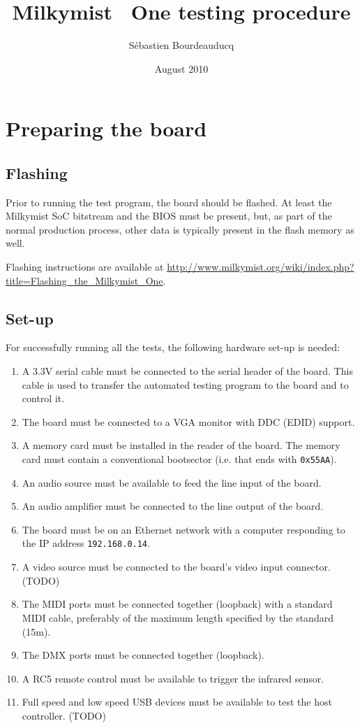 \documentclass[a4paper,11pt]{article}
\title{Milkymist\texttrademark~ One testing procedure}
\author{S\'ebastien Bourdeauducq}
\date{August 2010}
\begin{document}
\setlength{\parindent}{0pt}
\setlength{\parskip}{5pt}
\maketitle{}


\section{Preparing the board}
\subsection{Flashing}
Prior to running the test program, the board should be flashed. At least the Milkymist SoC bitstream and the BIOS must be present, but, as part of the normal production process, other data is typically present in the flash memory as well.

Flashing instructions are available at \url{http://www.milkymist.org/wiki/index.php?title=Flashing_the_Milkymist_One}.

\subsection{Set-up}
For successfully running all the tests, the following hardware set-up is needed:
\begin{enumerate}
\item A 3.3V serial cable must be connected to the serial header of the board. This cable is used to transfer the automated testing program to the board and to control it.
\item The board must be connected to a VGA monitor with DDC (EDID) support.
\item A memory card must be installed in the reader of the board. The memory card must contain a conventional bootsector (i.e. that ends with \verb!0x55AA!).
\item An audio source must be available to feed the line input of the board.
\item An audio amplifier must be connected to the line output of the board.
\item The board must be on an Ethernet network with a computer responding to the IP address \verb!192.168.0.14!.
\item A video source must be connected to the board's video input connector. (TODO)
\item The MIDI ports must be connected together (loopback) with a standard MIDI cable, preferably of the maximum length specified by the standard (15m).
\item The DMX ports must be connected together (loopback).
\item A RC5 remote control must be available to trigger the infrared sensor.
\item Full speed and low speed USB devices must be available to test the host controller. (TODO)
\end{enumerate}
\end{document}
